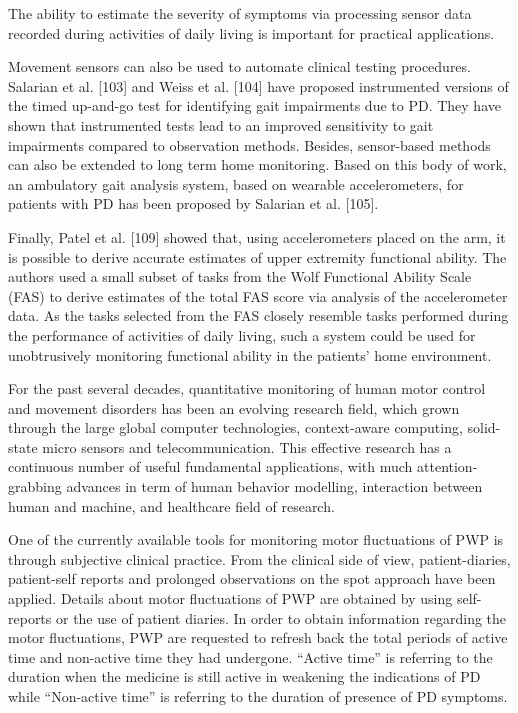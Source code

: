 The ability to estimate the severity of symptoms
via processing sensor data recorded during activities of
daily living is important for practical applications.
~\cite{patel2012}

Movement sensors can also be used to automate clinical
testing procedures. Salarian et al. [103] and Weiss et al.
[104] have proposed instrumented versions of the timed
up-and-go test for identifying gait impairments due to PD.
They have shown that instrumented tests lead to an
improved sensitivity to gait impairments compared to
observation methods. Besides, sensor-based methods can
also be extended to long term home monitoring. Based on
this body of work, an ambulatory gait analysis system,
based on wearable accelerometers, for patients with PD
has been proposed by Salarian et al. [105].
~\cite{patel2012}

Finally, Patel et al. [109] showed that, using
accelerometers placed on the arm, it is possible to derive
accurate estimates of upper extremity functional ability.
The authors used a small subset of tasks from the Wolf
Functional Ability Scale (FAS) to derive estimates of the
total FAS score via analysis of the accelerometer data. As
the tasks selected from the FAS closely resemble tasks
performed during the performance of activities of daily
living, such a system could be used for unobtrusively
monitoring functional ability in the patients’ home
environment.
~\cite{patel2012}


For the past several decades, quantitative monitoring of human motor control and movement
disorders has been an evolving research field, which grown through the large global computer
technologies, context-aware computing, solid-state micro sensors and telecommunication. This effective
research has a continuous number of useful fundamental applications, with much attention-grabbing
advances in term of human behavior modelling, interaction between human and machine, and healthcare
field of research.
~\cite{reviewassesenspark2015}


One of the currently available tools for monitoring motor fluctuations of PWP is through subjective
clinical practice. From the clinical side of view, patient-diaries, patient-self reports and prolonged
observations on the spot approach have been applied. Details about motor fluctuations of PWP are
obtained by using self-reports or the use of patient diaries. In order to obtain information regarding the motor fluctuations, PWP are requested to refresh back the total periods of active time and non-active
time they had undergone. “Active time” is referring to the duration when the medicine is still active in
weakening the indications of PD while “Non-active time” is referring to the duration of presence of
PD symptoms.
~\cite{reviewassesenspark2015}


